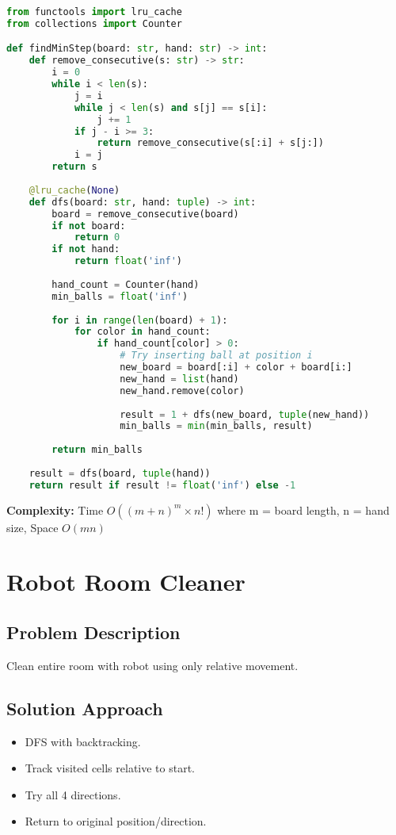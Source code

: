 \documentclass[10pt, a4paper]{article}
\begin{document}
\begin{lstlisting}[language=Python]
from functools import lru_cache
from collections import Counter

def findMinStep(board: str, hand: str) -> int:
    def remove_consecutive(s: str) -> str:
        i = 0
        while i < len(s):
            j = i
            while j < len(s) and s[j] == s[i]:
                j += 1
            if j - i >= 3:
                return remove_consecutive(s[:i] + s[j:])
            i = j
        return s
    
    @lru_cache(None)
    def dfs(board: str, hand: tuple) -> int:
        board = remove_consecutive(board)
        if not board:
            return 0
        if not hand:
            return float('inf')
        
        hand_count = Counter(hand)
        min_balls = float('inf')
        
        for i in range(len(board) + 1):
            for color in hand_count:
                if hand_count[color] > 0:
                    # Try inserting ball at position i
                    new_board = board[:i] + color + board[i:]
                    new_hand = list(hand)
                    new_hand.remove(color)
                    
                    result = 1 + dfs(new_board, tuple(new_hand))
                    min_balls = min(min_balls, result)
        
        return min_balls
    
    result = dfs(board, tuple(hand))
    return result if result != float('inf') else -1
\end{lstlisting}
\textbf{Complexity:} Time $O((m+n)^m \times n!)$ where m = board length, n = hand size, Space $O(mn)$

\section{Robot Room Cleaner}
\subsection*{Problem Description}
Clean entire room with robot using only relative movement.

\subsection*{Solution Approach}
\begin{itemize}
    \item DFS with backtracking.
    \item Track visited cells relative to start.
    \item Try all 4 directions.
    \item Return to original position/direction.
\end{itemize}
\end{document}
